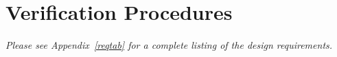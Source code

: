 \section{Verification Procedures}
\emph{Please see Appendix~\ref{reqtab} for a complete listing of the design requirements.}